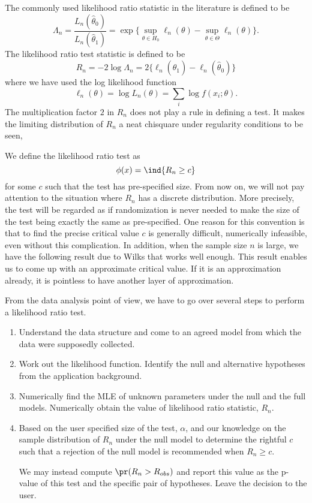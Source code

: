 The commonly used likelihood ratio statistic in the literature is defined to be
\[
\Lambda_n = \frac{ L_n(\hat \theta_0)}{L_n(\hat \theta_1)}
=
\exp \{ \sup_{\theta \in {H_0} } \ell_n(\theta) - \sup_{\theta \in \Theta } \ell_n( \theta) \}.
\]
The likelihood ratio test statistic is defined to be
\[
R_n = - 2 \log \Lambda_n = 2\{ \ell_n(\hat \theta_1) - \ell_n(\hat \theta_0)\}
\]
where we have used the log likelihood function
\[
\ell_n(\theta) = \log L_n(\theta) =  \sum_i \log f(x_i; \theta).
\]
The multiplication factor $2$ in $R_n$ does not play a rule in defining
a test. It makes the limiting distribution of $R_n$ a neat chisquare under
regularity conditions to be seen,

We define the likelihood ratio test as 
\[
\phi(x) = \ind\{ R_n \geq c\}
\]
for some $c$ such that the test has pre-specified size.
From now on, we will not pay attention to the situation where
$R_n$ has a discrete distribution. More precisely, the test will be regarded
as if randomization is never needed to make the size of the test
being exactly the same as pre-specified. 
One reason for this convention is that to find the precise
critical value $c$ is generally difficult, numerically infeasible, even without this complication. 
In addition, when the sample size $n$ is large, we have the following result due to Wilks that
works well enough. This result enables us to come up with an approximate critical value. 
If it is an approximation already, it is
pointless to have another layer of approximation.

From the data analysis point of view, we have to go over
several steps to perform a likelihood ratio test.

\begin{enumerate}
\item
Understand the data structure and come to an agreed model from which
the data were supposedly collected.

\item
Work out the likelihood function. Identify the null and alternative
hypotheses from the application background. 

\item
Numerically find the MLE of unknown parameters under the null and the full models. 
Numerically obtain the value of likelihood ratio statistic, $R_n$.

\item
Based on the user specified size of the test, $\alpha$,
and our knowledge on the sample distribution of $R_n$ under the null
model to determine the rightful $c$ such that a rejection of the
null model is recommended when $R_n \geq c$.

We may instead compute $\pr(R_n > R_{obs})$ and report
this value as the p-value of this test and the specific pair
of hypotheses. Leave the decision to the user.
\end{enumerate} 

